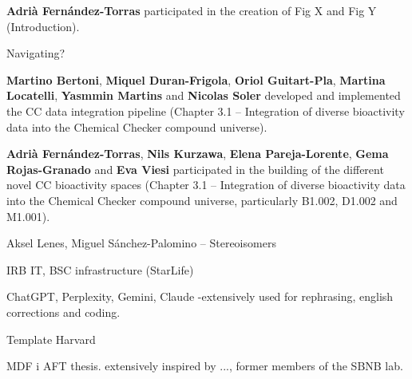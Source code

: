

\textbf{Adrià Fernández-Torras} participated in the creation of Fig X and Fig Y (Introduction).

Navigating?

\textbf{Martino Bertoni}, \textbf{Miquel Duran-Frigola}, \textbf{Oriol Guitart-Pla}, \textbf{Martina Locatelli}, \textbf{Yasmmin Martins} and \textbf{Nicolas Soler} developed and implemented the CC data integration pipeline (Chapter 3.1 -- Integration of diverse bioactivity data into the Chemical Checker compound universe).

\textbf{Adrià Fernández-Torras}, \textbf{Nils Kurzawa}, \textbf{Elena Pareja-Lorente}, \textbf{Gema Rojas-Granado} and \textbf{Eva Viesi} participated in the building of the different novel CC bioactivity spaces (Chapter 3.1 -- Integration of diverse bioactivity data into the Chemical Checker compound universe, particularly B1.002, D1.002 and M1.001).


Aksel Lenes, Miguel Sánchez-Palomino -- Stereoisomers



IRB IT, BSC infrastructure (StarLife)


ChatGPT, Perplexity, Gemini, Claude -extensively used for rephrasing, english corrections and coding. 


Template Harvard

MDF i AFT thesis. extensively inspired by ..., former members of the SBNB lab. 